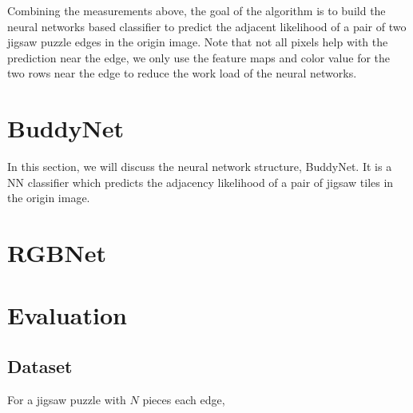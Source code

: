 \documentclass{article}
\begin{document}
Combining the measurements above, the goal of the algorithm is to build the neural networks based classifier to predict the adjacent likelihood of a pair of two jigsaw puzzle edges in the origin image. Note that not all pixels help with the prediction near the edge, we only use the feature maps and color value for the two rows near the edge to reduce the work load of the neural networks.

\section{BuddyNet}

In this section, we will discuss the neural network structure, BuddyNet. It is a NN classifier which predicts the adjacency likelihood of a pair of jigsaw tiles in the origin image.



\section{RGBNet}



\section{Evaluation}

\subsection{Dataset}

For a jigsaw puzzle with $N$ pieces each edge,





\end{document}
